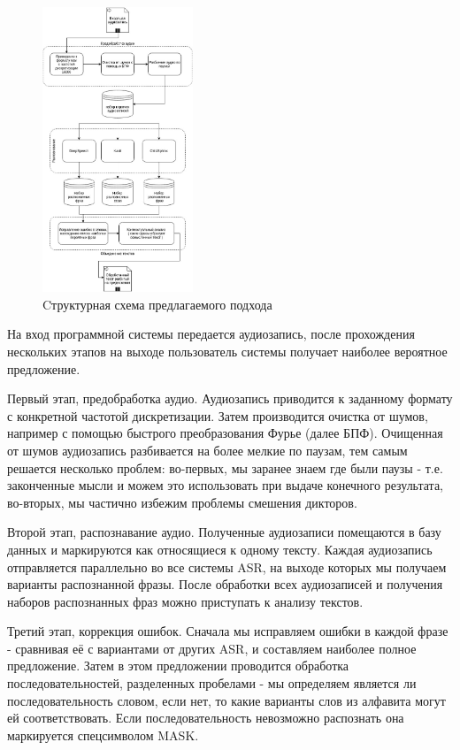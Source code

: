 \documentclass[conference]{IEEEtran}
\begin{document}
\begin{figure}[h]
\centering
\includegraphics[width=0.4\textwidth]{./Diagram1.jpg}
\caption{Cтруктурная схема предлагаемого подхода}
\label{fig:Panel}
\end{figure}

На вход программной системы передается аудиозапись, после прохождения нескольких этапов на выходе пользователь системы получает наиболее вероятное предложение.

Первый этап, предобработка аудио. Аудиозапись приводится к заданному формату с конкретной частотой дискретизации. Затем производится очистка от шумов, например с помощью быстрого преобразования Фурье (далее БПФ). Очищенная от шумов аудиозапись разбивается на более мелкие по паузам, тем самым решается несколько проблем: во-первых, мы заранее знаем где были паузы - т.е. законченные мысли и можем это использовать при выдаче конечного результата, во-вторых, мы частично избежим проблемы смешения дикторов.

Второй этап, распознавание аудио. Полученные аудиозаписи помещаются в базу данных и маркируются как относящиеся к одному тексту. Каждая аудиозапись отправляется параллельно во все системы ASR, на выходе которых мы получаем варианты распознанной фразы. После обработки всех аудиозаписей и получения наборов распознанных фраз можно приступать к анализу текстов.

Третий этап, коррекция ошибок. Сначала мы исправляем ошибки в каждой фразе - сравнивая её с вариантами от других ASR, и составляем наиболее полное предложение. Затем в этом предложении проводится обработка последовательностей, разделенных пробелами - мы определяем является ли последовательность словом, если нет, то какие варианты слов из алфавита могут ей соответствовать. Если последовательность невозможно распознать она маркируется спецсимволом MASK.
\end{document}
